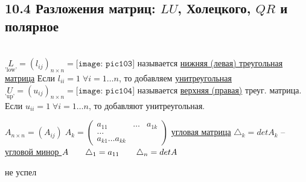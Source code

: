 \documentclass[../main.tex]{subfiles}
\begin{document}
	\subsection{10.4 Разложения матриц: $LU$, Холецкого, $QR$ и полярное}
	\begin{defin}\ \\
		$\underset{\text{'low'}}{L} = (l_{ij})_{n\times n} = \texttt{[image: pic103]}$ называется \underline{нижняя (левая) треугольная матрица}\n
		Если $l_{ii} = 1 \; \forall i = 1\ldots n$, то добавляем \underline{унитреугольная}\n
		$\underset{\text{'up'}}{U} = (u_{ij})_{n\times n} = \texttt{[image: pic104]}$ называется \underline{верхняя (правая)} треуг. матрица.\n
		Если $u_{ii} = 1 \; \forall i = 1\ldots n$, то добавляют унитреугольная.
	\end{defin}
	\begin{defin}
		$A_{n\times n} = (A_{ij}) \; A_k = \begin{pmatrix}
			a_{11} & \ldots & a_{1k}\\
			\ldots\\
			a_{k1} \ldots a_{kk}
		\end{pmatrix}$ \underline{угловая матрица}\n
		$\triangle_k = det A_k$ -- \underline{угловой минор } $A \Space \triangle_1 = a_{11} \Space \triangle_n = det A$
	\end{defin}
	\begin{theorem}
		не успел
	\end{theorem}
\end{document}
